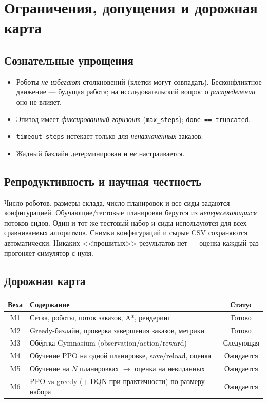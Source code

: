 \documentclass[11pt,a4paper]{article}
\newcommand{\code}[1]{\texttt{#1}}
\begin{document}
\section{Ограничения, допущения и дорожная карта}
\subsection{Сознательные упрощения}
\begin{itemize}[nosep]
\item Роботы \emph{не избегают} столкновений (клетки могут совпадать).
Бесконфликтное движение — будущая работа; на исследовательский вопрос о
\emph{распределении} оно не влияет.
\item Эпизод имеет \emph{фиксированный горизонт} (\code{max\_steps});
\code{done == truncated}.
\item \code{timeout\_steps} истекает только для \emph{неназначенных} заказов.
\item Жадный базлайн детерминирован и \emph{не} настраивается.
\end{itemize}

\subsection{Репродуктивность и научная честность}
Число роботов, размеры склада, число планировок и все сиды задаются
конфигурацией. Обучающие/тестовые планировки берутся из \emph{непересекающихся}
потоков сидов. Один и тот же тестовый набор и сиды используются для всех
сравниваемых алгоритмов. Снимки конфигураций и сырые CSV сохраняются
автоматически. Никаких <<прошитых>> результатов нет — оценка каждый раз
прогоняет симулятор с нуля.

\subsection{Дорожная карта}
\begin{center}
\begin{tabular}{@{}clc@{}}
\toprule
\textbf{Веха} & \textbf{Содержание} & \textbf{Статус} \\
\midrule
M1 & Сетка, роботы, поток заказов, A*, рендеринг & Готово \\
M2 & Greedy-базлайн, проверка завершения заказов, метрики & Готово \\
M3 & Обёртка Gymnasium (observation/action/reward) & Следующая \\
M4 & Обучение PPO на одной планировке, save/reload, оценка & Ожидается \\
M5 & Обучение на $N$ планировках $\rightarrow$ оценка на невиданных & Ожидается \\
M6 & PPO vs greedy (+ DQN при практичности) по размеру набора & Ожидается \\
\bottomrule
\end{tabular}
\end{center}
\end{document}
